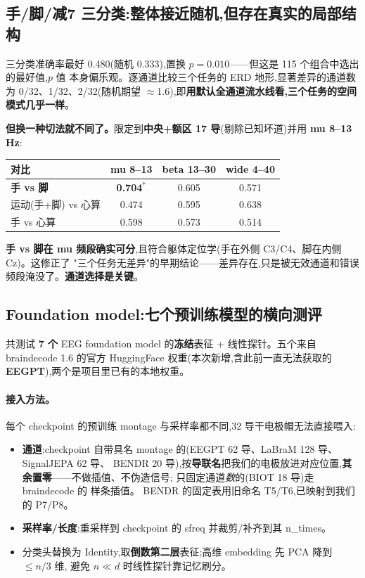 \documentclass[11pt]{ctexart}
\begin{document}
\subsection{手/脚/减7 三分类:整体接近随机,但存在真实的局部结构}
三分类准确率最好 0.480(随机 0.333),置换 $p=0.010$——但这是 115 个组合中选出的最好值,$p$ 值
本身偏乐观。逐通道比较三个任务的 ERD 地形,显著差异的通道数为 0/32、1/32、2/32(随机期望
$\approx$1.6),即\textbf{用默认全通道流水线看,三个任务的空间模式几乎一样}。

\textbf{但换一种切法就不同了。}限定到\textbf{中央+额区 17 导}(剔除已知坏道)并用 \textbf{mu 8–13\,Hz}:

\begin{center}\small
\begin{tabular}{@{}lccc@{}}
\toprule
对比 & mu 8–13 & beta 13–30 & wide 4–40 \\
\midrule
\textbf{手 vs 脚} & \textcolor{good}{\textbf{0.704}}$^{*}$ & 0.605 & 0.571 \\
运动(手+脚) vs 心算 & 0.474 & 0.595 & 0.638 \\
手 vs 心算 & 0.598 & 0.573 & 0.514 \\
\bottomrule
\end{tabular}
\end{center}

\textbf{手 vs 脚在 mu 频段确实可分},且符合躯体定位学(手在外侧 C3/C4、脚在内侧 Cz)。这修正了
"三个任务无差异"的早期结论——差异存在,只是被无效通道和错误频段淹没了。\textbf{通道选择是关键}。

\subsection{Foundation model:七个预训练模型的横向测评}
共测试 \textbf{7 个} EEG foundation model 的\textbf{冻结}表征 + 线性探针。五个来自 braindecode 1.6
的官方 HuggingFace 权重(本次新增,含此前一直无法获取的 \textbf{EEGPT}),两个是项目里已有的本地权重。

\paragraph{接入方法。}每个 checkpoint 的预训练 montage 与采样率都不同,32 导干电极帽无法直接喂入:
\begin{itemize}
\item \textbf{通道}:checkpoint 自带具名 montage 的(EEGPT 62 导、LaBraM 128 导、SignalJEPA 62 导、
      BENDR 20 导),按\textbf{导联名}把我们的电极放进对应位置,\textbf{其余置零}——不做插值、不伪造信号;
      只固定通道\emph{数}的(BIOT 18 导)走 braindecode 的  样条插值。
      BENDR 的固定表用旧命名 T5/T6,已映射到我们的 P7/P8。
\item \textbf{采样率/长度}:重采样到 checkpoint 的 sfreq 并裁剪/补齐到其 n\_times。
\item 分类头替换为 Identity,取\textbf{倒数第二层}表征;高维 embedding 先 PCA 降到 $\le n/3$ 维,
      避免 $n \ll d$ 时线性探针靠记忆刷分。
\end{itemize}
\end{document}
